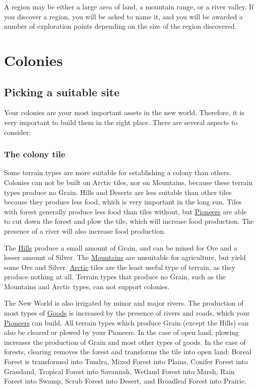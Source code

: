 \documentclass[12pt]{book}
\begin{document}
A region may be either a large area of land, a mountain range, or a
river valley. If you discover a region, you will be asked to name it,
and you will be awarded a number of exploration points depending on
the size of the region discovered.


\hypertarget{Colonies}{\chapter{Colonies}}

\hypertarget{Picking a suitable site}{\section{Picking a suitable site}}

Your colonies are your most important assets in the new world.
Therefore, it is very important to build them in the right
place. There are several aspects to consider:

\hypertarget{The colony tile}{\subsection{The colony tile}}

Some terrain types are more suitable for establishing a colony than
others. Colonies can not be built on Arctic tiles, nor on Mountains,
because these terrain types produce no Grain. Hills and Deserts are
less suitable than other tiles because they produce less food, which
is very important in the long run. Tiles with forest generally produce
less food than tiles without, but \hyperlink{Pioneer}{Pioneers} are
able to cut down the forest and plow the tile, which will increase
food production. The presence of a river will also increase food
production.

The \hyperlink{Hills}{Hills} produce a small amount of Grain, and can
be mined for Ore and a lesser amount of Silver. The
\hyperlink{Mountains}{Mountains} are unsuitable for agriculture, but
yield some Ore and Silver. \hyperlink{Arctic}{Arctic} tiles are the
least useful type of terrain, as they produce nothing at all. Terrain
types that produce no Grain, such as the Mountains and Arctic types,
can not support colonies.

The New World is also irrigated by minor and major rivers. The
production of most types of \hyperlink{Goods}{Goods} is increased by
the presence of rivers and roads, which your
\hyperlink{Pioneer}{Pioneers} can build. All terrain types which
produce Grain (except the Hills) can also be cleared or plowed by your
Pioneers. In the case of open land, plowing increases the production
of Grain and most other types of goods. In the case of forests,
clearing removes the forest and transforms the tile into open land:
Boreal Forest is transformed into Tundra, Mixed Forest into Plains,
Conifer Forest into Grassland, Tropical Forest into Savannah, Wetland
Forest into Marsh, Rain Forest into Swamp, Scrub Forest into Desert,
and Broadleaf Forest into Prairie.
\end{document}
